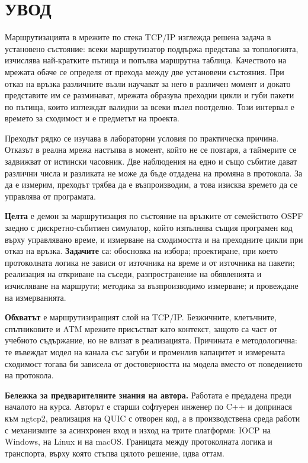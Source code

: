 \section*{УВОД}
\label{sec:introduction}

Маршрутизацията в мрежите по стека TCP/IP изглежда решена задача в установено състояние:
всеки маршрутизатор поддържа представа за топологията, изчислява най-кратките пътища и
попълва маршрутна таблица. Качеството на мрежата обаче се определя от прехода между две
установени състояния. При отказ на връзка различните възли научават за него в различен
момент и докато представите им се разминават, мрежата образува преходни цикли и губи пакети
по пътища, които изглеждат валидни за всеки възел поотделно. Този интервал е времето за
сходимост и е предметът на проекта.

Преходът рядко се изучава в лабораторни условия по практическа причина. Отказът в реална
мрежа настъпва в момент, който не се повтаря, а таймерите се задвижват от истински часовник.
Две наблюдения на едно и също събитие дават различни числа и разликата не може да бъде
отдадена на промяна в протокола. За да е измерим, преходът трябва да е възпроизводим, а това
изисква времето да се управлява от програмата.

\textbf{Целта} е демон за маршрутизация по състояние на връзките от семейството OSPF заедно с
дискретно-събитиен симулатор, който изпълнява същия програмен код върху управлявано време, и
измерване на сходимостта и на преходните цикли при отказ на връзка. \textbf{Задачите} са:
обосновка на избора; проектиране, при което протоколната логика не зависи от източника на
време и от източника на пакети; реализация на откриване на съседи, разпространение на
обявленията и изчисляване на маршрути; методика за възпроизводимо измерване; и провеждане на
измерванията.

\textbf{Обхватът} е маршрутизиращият слой на TCP/IP. Безжичните, клетъчните, спътниковите и
ATM мрежите присъстват като контекст, защото са част от учебното съдържание, но не влизат в
реализацията. Причината е методологична: те въвеждат модел на канала със загуби и променлив
капацитет и измерената сходимост тогава би зависела от достоверността на модела вместо от
поведението на протокола.

\textbf{Бележка за предварителните знания на автора.} Работата е предадена преди началото на
курса. Авторът е старши софтуерен инженер по C++ и допринася към ngtcp2, реализация на QUIC с
отворен код, а в производствена среда работи с механизмите за асинхронен вход и изход на трите
платформи: IOCP на Windows,  на Linux и  на macOS. Границата между
протоколната логика и транспорта, върху която стъпва цялото решение, идва оттам.
